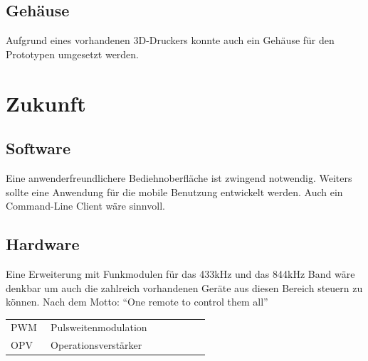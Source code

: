 \documentclass[11pt,a4paper,bibtotoc,oneside]{scrbook}
\begin{document}
\section{Gehäuse}
Aufgrund eines vorhandenen 3D-Druckers konnte auch ein Gehäuse für den Prototypen umgesetzt werden.

\chapter{Zukunft}

\section{Software}
Eine anwenderfreundlichere Bediehnoberfläche ist zwingend notwendig. Weiters sollte eine Anwendung für die
mobile Benutzung entwickelt werden. Auch ein Command-Line Client wäre sinnvoll.

\section{Hardware}
Eine Erweiterung mit Funkmodulen für das 433kHz und das 844kHz Band wäre denkbar um auch die zahlreich vorhandenen
Geräte aus diesen Bereich steuern zu können. Nach dem Motto: ``One remote to control them all''



%
%

%

\hspace{-17mm}\begin{tabular}{>{\raggedleft}p{0.2\linewidth} p{0.75\linewidth} p{0.1\linewidth}}
PWM & Pulsweitenmodulation \\
OPV & Operationsverstärker
\end{tabular}
\end{document}
